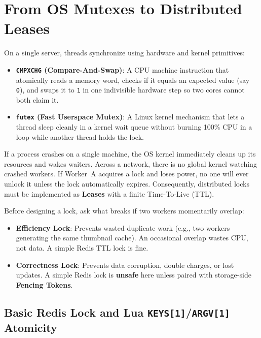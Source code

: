 \section{From OS Mutexes to Distributed Leases}

On a single server, threads synchronize using hardware and kernel primitives:
\begin{itemize}[leftmargin=18pt]
  \item \textbf{\texttt{CMPXCHG} (Compare-And-Swap)}: A CPU machine instruction that atomically reads a memory word, checks if it equals an expected value (say \texttt{0}), and swaps it to \texttt{1} in one indivisible hardware step so two cores cannot both claim it.
  \item \textbf{\texttt{futex} (Fast Userspace Mutex)}: A Linux kernel mechanism that lets a thread sleep cleanly in a kernel wait queue without burning 100\% CPU in a loop while another thread holds the lock.
\end{itemize}
If a process crashes on a single machine, the OS kernel immediately cleans up its resources and wakes waiters. Across a network, there is no global kernel watching crashed workers. If Worker~A acquires a lock and loses power, no one will ever unlock it unless the lock automatically expires. Consequently, distributed locks must be implemented as \textbf{Leases} with a finite Time-To-Live (TTL).

\begin{intuitionbox}
Before designing a lock, ask what breaks if two workers momentarily overlap:
\begin{itemize}[leftmargin=12pt]
  \item \textbf{Efficiency Lock}: Prevents wasted duplicate work (e.g., two workers generating the same thumbnail cache). An occasional overlap wastes CPU, not data. A simple Redis TTL lock is fine.
  \item \textbf{Correctness Lock}: Prevents data corruption, double charges, or lost updates. A simple Redis lock is \textbf{unsafe} here unless paired with storage-side \textbf{Fencing Tokens}.
\end{itemize}
\end{intuitionbox}

\subsection{Basic Redis Lock and Lua \texttt{KEYS[1]}/\texttt{ARGV[1]} Atomicity}

